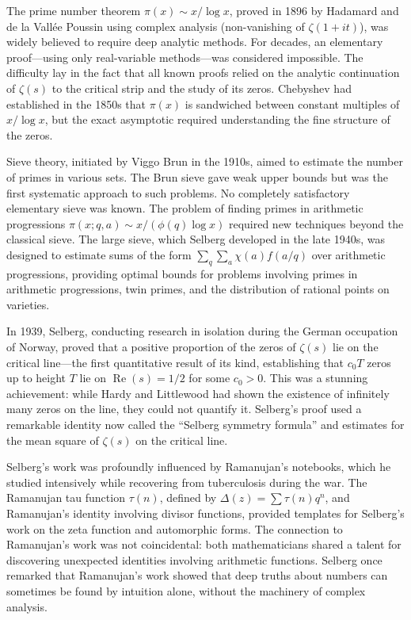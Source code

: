 The prime number theorem $\pi(x) \sim x/\log x$, proved in 1896 by Hadamard and de la Vall\'{e}e Poussin using complex analysis (non-vanishing of $\zeta(1+it)$), was widely believed to require deep analytic methods. For decades, an elementary proof---using only real-variable methods---was considered impossible. The difficulty lay in the fact that all known proofs relied on the analytic continuation of $\zeta(s)$ to the critical strip and the study of its zeros. Chebyshev had established in the 1850s that $\pi(x)$ is sandwiched between constant multiples of $x/\log x$, but the exact asymptotic required understanding the fine structure of the zeros.

Sieve theory, initiated by Viggo Brun in the 1910s, aimed to estimate the number of primes in various sets. The Brun sieve gave weak upper bounds but was the first systematic approach to such problems. No completely satisfactory elementary sieve was known. The problem of finding primes in arithmetic progressions $\pi(x; q, a) \sim x/(\phi(q) \log x)$ required new techniques beyond the classical sieve. The large sieve, which Selberg developed in the late 1940s, was designed to estimate sums of the form $\sum_q \sum_a \chi(a) f(a/q)$ over arithmetic progressions, providing optimal bounds for problems involving primes in arithmetic progressions, twin primes, and the distribution of rational points on varieties.

In 1939, Selberg, conducting research in isolation during the German occupation of Norway, proved that a positive proportion of the zeros of $\zeta(s)$ lie on the critical line---the first quantitative result of its kind, establishing that $c_0 T$ zeros up to height $T$ lie on $\operatorname{Re}(s) = 1/2$ for some $c_0 > 0$. This was a stunning achievement: while Hardy and Littlewood had shown the existence of infinitely many zeros on the line, they could not quantify it. Selberg's proof used a remarkable identity now called the ``Selberg symmetry formula'' and estimates for the mean square of $\zeta(s)$ on the critical line.

Selberg's work was profoundly influenced by Ramanujan's notebooks, which he studied intensively while recovering from tuberculosis during the war. The Ramanujan tau function $\tau(n)$, defined by $\Delta(z) = \sum \tau(n) q^n$, and Ramanujan's identity involving divisor functions, provided templates for Selberg's work on the zeta function and automorphic forms. The connection to Ramanujan's work was not coincidental: both mathematicians shared a talent for discovering unexpected identities involving arithmetic functions. Selberg once remarked that Ramanujan's work showed that deep truths about numbers can sometimes be found by intuition alone, without the machinery of complex analysis.

